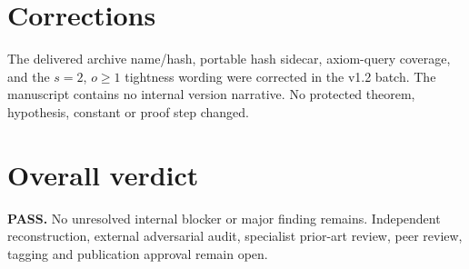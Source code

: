 \documentclass[11pt]{article}
\begin{document}
\section{Corrections}
The delivered archive name/hash, portable hash sidecar, axiom-query coverage,
and the $s=2$, $o\ge1$ tightness wording were corrected in the v1.2 batch.
The manuscript contains no internal version narrative. No protected theorem,
hypothesis, constant or proof step changed.
\section{Overall verdict}
\textbf{PASS.} No unresolved internal blocker or major finding remains.
Independent reconstruction, external adversarial audit, specialist prior-art
review, peer review, tagging and publication approval remain open.
\end{document}
